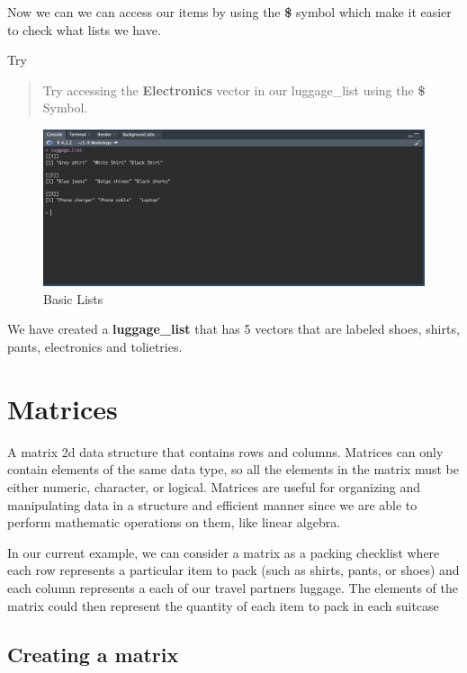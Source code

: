 \documentclass[
]{book}
\begin{document}
Now we can we can access our items by using the \textbf{\$} symbol which make it easier to check what lists we have.

Try

\begin{quote}
Try accessing the \textbf{Electronics} vector in our luggage\_list using the \textbf{\$} Symbol.
\end{quote}

\begin{figure}
\includegraphics[width=29.36in]{images/3.6listconsole} \caption{Basic Lists}\label{fig:unnamed-chunk-20}
\end{figure}

We have created a \textbf{luggage\_list} that has 5 vectors that are labeled shoes, shirts, pants, electronics and tolietries.

\hypertarget{matrices}{%
\section{Matrices}\label{matrices}}

A matrix 2d data structure that contains rows and columns. Matrices can only contain elements of the same data type, so all the elements in the matrix must be either numeric, character, or logical. Matrices are useful for organizing and manipulating data in a structure and efficient manner since we are able to perform mathematic operations on them, like linear algebra.

In our current example, we can consider a matrix as a packing checklist where each row represents a particular item to pack (such as shirts, pants, or shoes) and each column represents a each of our travel partners luggage. The elements of the matrix could then represent the quantity of each item to pack in each suitcase

\hypertarget{creating-a-matrix}{%
\subsection{Creating a matrix}\label{creating-a-matrix}}
\end{document}
